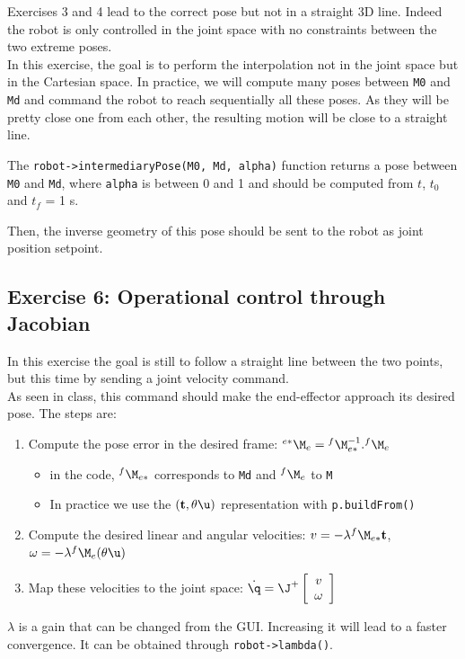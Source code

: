 \documentclass{ecnreport}
\begin{document}
Exercises 3 and 4 lead to the correct pose but not in a straight 3D line. Indeed the robot is only controlled in the joint space with no constraints between the two extreme poses.\\
In this exercise, the goal is to perform the interpolation not in the joint space but in the Cartesian space. In practice, we will compute many poses between 
\texttt{M0} and \texttt{Md} and command the robot to reach sequentially all these poses. As they will be pretty close one from each other, the resulting motion 
will be close to a straight line.

The \texttt{robot->intermediaryPose(M0, Md, alpha)} function returns a pose between \texttt{M0} and \texttt{Md}, where \texttt{alpha} is between 0 and 1 and should be computed from $t$, $t_0$ and $t_f$ = 1 s.

Then, the inverse geometry of this pose should be sent to the robot as joint position setpoint.

\newpage
\subsection*{Exercise 6: Operational control through Jacobian}

In this exercise the goal is still to follow a straight line between the two points, but this time by sending a joint velocity command.\\

As seen in class, this command should make the end-effector approach its desired pose. The steps are:
\begin{enumerate}
	\item Compute the pose error in the desired frame: ${}^{e*}\M_e = {}^{f}\M_{e*}^{-1}.{}^{f}\M_e$
	\begin{itemize}
		\item in the code, ${}^{f}\M_{e*}$ corresponds to \texttt{Md} and ${}^{f}\M_e$ to \texttt{M} 
		\item In practice we use the $(\mathbf{t}, \theta\u)$ representation with \texttt{p.buildFrom()}
	\end{itemize}
	\item Compute the desired linear and angular velocities: $v = -\lambda{}^{f}\M_{e*}\mathbf{t}$, \quad $\omega = -\lambda{}^{f}\M_{e} (\theta\u)$
	\item Map these velocities to the joint space: $\dot\q = \J^+ \left[\begin{array}{c}v\\\omega\end{array}\right]$
\end{enumerate}
$\lambda$ is a gain that can be changed from the GUI. Increasing it will lead to a faster convergence. It can be obtained through \texttt{robot->lambda()}.
\end{document}
